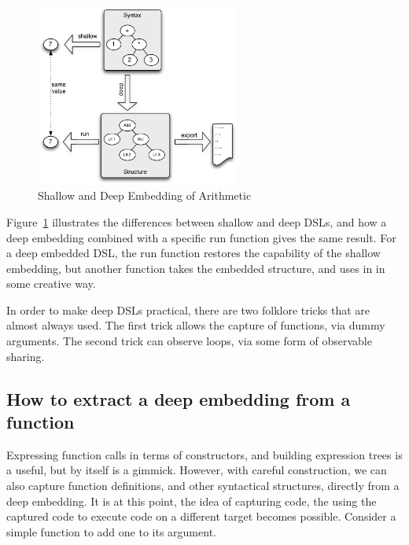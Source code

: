 \documentclass[11pt]{article}
\begin{document}
\begin{figure}[!t]
  \centering        
  \includegraphics[width=0.6\textwidth]{images/DeepEmbedding.pdf}
  \caption{Shallow and Deep Embedding of Arithmetic}
  \label{fig:deep-dsls}
\end{figure}

Figure~\ref{fig:deep-dsls} illustrates the differences between shallow and deep DSLs,
and how a deep embedding combined with a specific run function gives the same result.
For a deep embedded DSL, the run function restores the capability of the shallow
embedding, but another function takes the embedded structure, and uses in in some creative way. 

In order to make deep DSLs practical, there are two folklore tricks that are almost
always used.
The first trick allows the capture of functions, via dummy arguments. The second trick can observe loops,
via some form of observable sharing. 

\subsection{How to extract a deep embedding from a function}

Expressing function calls in terms of constructors,  and
building expression trees is a useful, but by itself is a gimmick. 
However, with careful construction, we can also capture function definitions,
and other syntactical structures,
directly from a deep embedding. It is at this
point, the idea of capturing code,
the using the captured code to execute code
on a different target becomes possible.
Consider a simple function to add one to its argument.
\end{document}
